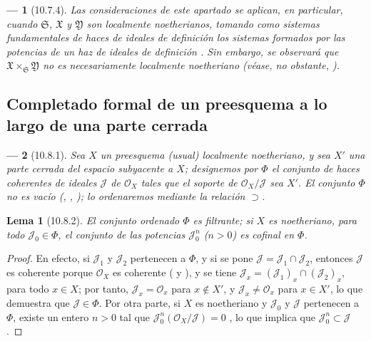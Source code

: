 \documentclass[oneside]{amsart}
\theoremstyle{ega-env-style}
\newtheorem*{env}{---}
\theoremstyle{ega-thm-env-style}
\newtheorem*{lemma}{Lema}
\theoremstyle{ega-defn-env-style}
\let\EGAOriginalLabel\label
\renewcommand{\label}[1]{\phantomsection\EGAOriginalLabel{#1}}
\begin{document}
\begin{env}[10.7.4]
Las consideraciones de este apartado se aplican, en particular, cuando $\mathfrak{S}$, $\mathfrak{X}$ y $\mathfrak{Y}$ son localmente noetherianos, tomando como sistemas fundamentales de haces de ideales de definición los sistemas formados por las potencias de un haz de ideales de definición .
Sin embargo, se observará que $\mathfrak{X}\times_{\mathfrak{S}}\mathfrak{Y}$ no es necesariamente localmente noetheriano (véase, no obstante, ).
\end{env}

\subsection{Completado formal de un preesquema a lo largo de una parte cerrada}
\label{subsection:I.10.8}

\begin{env}[10.8.1]
\label{I.10.8.1}
Sea $X$ un preesquema (usual) \emph{localmente noetheriano}, y sea $X'$ una parte cerrada del espacio subyacente a $X$; designemos por $\Phi$ el conjunto de haces \emph{coherentes} de ideales $\mathscr{J}$ de $\mathscr{O}_X$ tales que el soporte de $\mathscr{O}_X/\mathscr{J}$ sea $X'$.
El conjunto $\Phi$ no es vacío (, , ); lo ordenaremos mediante la relación $\supset$.
\end{env}

\begin{lemma}[10.8.2]
\label{I.10.8.2}
El conjunto ordenado $\Phi$ es filtrante; si $X$ es noetheriano, para todo $\mathscr{J}_0\in\Phi$, el conjunto de las potencias $\mathscr{J}_0^n$ ($n>0$) es cofinal en $\Phi$.
\end{lemma}

\begin{proof}
En efecto, si $\mathscr{J}_1$ y $\mathscr{J}_2$ pertenecen a $\Phi$, y si se pone $\mathscr{J}=\mathscr{J}_1\cap\mathscr{J}_2$, entonces $\mathscr{J}$ es coherente porque $\mathscr{O}_X$ es coherente ( y ), y se tiene $\mathscr{J}_x=(\mathscr{J}_1)_x\cap(\mathscr{J}_2)_x$, para todo $x\in X$; por tanto, $\mathscr{J}_x=\mathscr{O}_x$ para $x\notin X'$, y $\mathscr{J}_x\neq\mathscr{O}_x$ para $x\in X'$, lo que demuestra que $\mathscr{J}\in\Phi$.
Por otra parte, si $X$ es noetheriano y $\mathscr{J}_0$ y $\mathscr{J}$ pertenecen a $\Phi$, existe un entero $n>0$ tal que $\mathscr{J}_0^n(\mathscr{O}_X/\mathscr{J})=0$ , lo que implica que $\mathscr{J}_0^n\subset\mathscr{J}$.
\end{proof}
\end{document}

